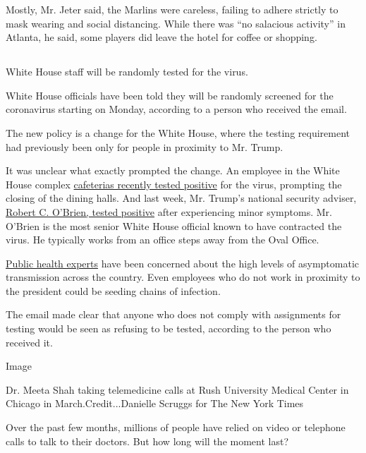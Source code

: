 Mostly, Mr. Jeter said, the Marlins were careless, failing to adhere
strictly to mask wearing and social distancing. While there was ``no
salacious activity'' in Atlanta, he said, some players did leave the
hotel for coffee or shopping.

\hypertarget{-9}{%
\subsection{}\label{-9}}

White House staff will be randomly tested for the virus.

White House officials have been told they will be randomly screened for
the coronavirus starting on Monday, according to a person who received
the email.

The new policy is a change for the White House, where the testing
requirement had previously been only for people in proximity to Mr.
Trump.

It was unclear what exactly prompted the change. An employee in the
White House complex
\href{https://www.nytimes.com/2020/07/22/us/politics/white-house-employee-covid-19.html}{cafeterias
recently tested positive} for the virus, prompting the closing of the
dining halls. And last week, Mr. Trump's national security adviser,
\href{https://www.nytimes.com/2020/07/27/us/politics/robert-obrien-virus.html}{Robert
C. O'Brien, tested positive} after experiencing minor symptoms. Mr.
O'Brien is the most senior White House official known to have contracted
the virus. He typically works from an office steps away from the Oval
Office.

\href{https://www.nytimes.com/2020/08/02/health/dr-birx-coronavirus-phase.html}{Public
health experts} have been concerned about the high levels of
asymptomatic transmission across the country. Even employees who do not
work in proximity to the president could be seeding chains of infection.

The email made clear that anyone who does not comply with assignments
for testing would be seen as refusing to be tested, according to the
person who received it.

Image

Dr. Meeta Shah taking telemedicine calls at Rush University Medical
Center in Chicago in March.Credit...Danielle Scruggs for The New York
Times

Over the past few months, millions of people have relied on video or
telephone calls to talk to their doctors. But how long will the moment
last?

